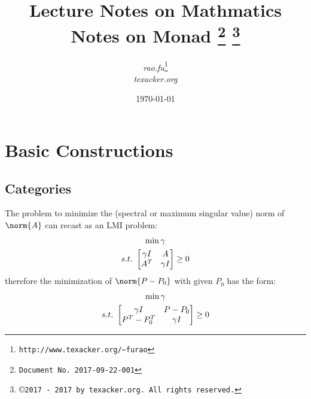 \documentclass{article}
\begin{document}


\title{\textbf{Lecture Notes on Mathmatics} \\[1em] Notes on Monad
{\footnote{\texttt{Document No. 2017-09-22-001}}}
{\footnote{\copyright \texttt{2017 - 2017 by texacker.org. All rights reserved.}}}
}

\author{%
\small{\textit{rao.fu}}\thanks{\texttt{http://www.texacker.org/\~{}furao}} \\ \small{\textit{texacker.org}}
}
\date{\today}

\maketitle

\section{Basic Constructions}
\subsection{Categories}
The problem to minimize the (spectral or maximum singular value) norm of $\norm{A}$
can recast as an LMI problem:
\begin{gather}
\min \gamma \\
s.t.\,\,
\begin{bmatrix}
\gamma I & A \\
A^T      & \gamma I
\end{bmatrix}
\ge 0 \notag
\end{gather}
therefore the minimization of $\norm{P - P_0}$ with given $P_0$
has the form:
\begin{gather}
\min \gamma \\
s.t.\,\,
\begin{bmatrix}
\gamma I    & P - P_0 \\
P^T - P_0^T & \gamma I
\end{bmatrix}
\ge 0 \notag
\end{gather}
\end{document}
